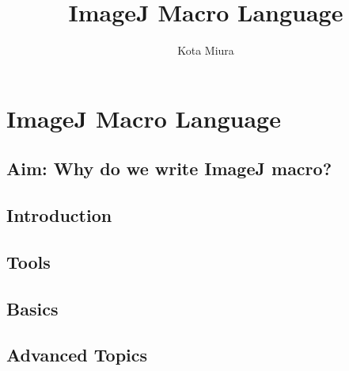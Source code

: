 \documentclass[]{book}
\author{Kota Miura}\title{ImageJ Macro Language}
\begin{document}

\setcounter{chapter}{2}

\chapter{ImageJ Macro Language}
\tableofcontents

\section{Aim: Why do we write ImageJ macro?}
  
  
\section{Introduction}
  

\newpage

\section{Tools}
\label{sec:tools}
 

\newpage

\section{Basics}
\label{sec:ImageJMacroBasics}

  
  
  
\newpage



\newpage

\section{Advanced Topics}
\label{sec:advancedTopics}
\end{document}
